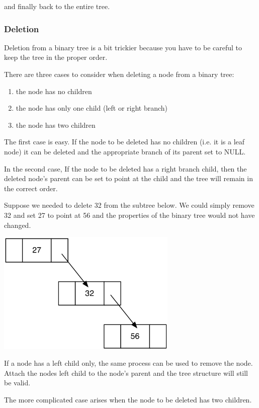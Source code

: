 and finally back to the entire tree.

\subsubsection{Deletion}

Deletion from a binary tree is a bit trickier because you have to be
careful to keep the tree in the proper order.

There are three cases to consider when deleting a node from a binary
tree:

\begin{enumerate}
\def\labelenumi{\arabic{enumi})}
\item
  the node has no children
\item
  the node has only one child (left or right branch)
\item
  the node has two children
\end{enumerate}


The first case is easy. If the node to be deleted has no children (i.e.
it is a leaf node) it can be deleted and the appropriate branch of its
parent set to NULL.

In the second case, If the node to be deleted has a right branch child,
then the deleted node's parent can be set to point at the child and the
tree will remain in the correct order.

Suppose we needed to delete 32 from the subtree below. We could simply
remove 32 and set 27 to point at 56 and the properties of the binary
tree would not have changed.

\includegraphics[width=3.38889in]{pictures/bintree6.png}

If a node has a left child only, the same process can be used to remove
the node. Attach the nodes left child to the node's parent and the tree
structure will still be valid.

The more complicated case arises when the node to be deleted has two
children.

